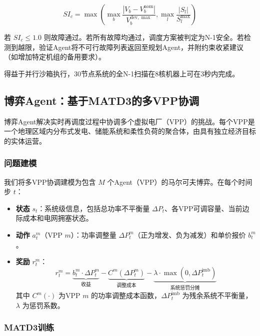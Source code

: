 \documentclass[conference]{IEEEtran}
\begin{document}
\begin{equation}
SI_c = \max\left( \max_{b} \frac{|V_b - V_b^{\text{nom}}|}{V_b^{\text{dev},\max}}, \max_{l} \frac{|S_l|}{S_l^{\max}} \right)
\end{equation}

若 $SI_c \leq 1.0$ 则故障通过。若所有故障均通过，调度方案被判定为N-1安全。若检测到越限，验证Agent将不可行故障列表返回至规划Agent，并附约束收紧建议（如增加特定机组的备用要求）。

得益于并行沙箱执行，30节点系统的全N-1扫描在8核机器上可在3秒内完成。

\subsection{博弈Agent：基于MATD3的多VPP协调}

博弈Agent解决实时再调度过程中协调多个虚拟电厂（VPP）的挑战。每个VPP是一个地理区域内分布式发电、储能系统和柔性负荷的聚合体，由具有独立经济目标的实体运营。

\subsubsection{问题建模}

我们将多VPP协调建模为包含 $M$ 个Agent（VPP）的马尔可夫博弈。在每个时间步 $t$：

\begin{itemize}
    \item \textbf{状态} $s_t$：系统级信息，包括总功率不平衡量 $\Delta P_t$、各VPP可调容量、当前边际成本和电网拥塞状态。
    \item \textbf{动作} $a_t^m$（VPP $m$）：功率调整量 $\Delta P_t^m$（正为增发、负为减发）和单价报价 $b_t^m$。
    \item \textbf{奖励} $r_t^m$：
    \begin{equation}
    r_t^m = \underbrace{b_t^m \cdot \Delta P_t^m}_{\text{收益}} - \underbrace{C^m(\Delta P_t^m)}_{\text{调整成本}} - \underbrace{\lambda \cdot \max(0, \Delta P_t^{\text{imb}})}_{\text{系统惩罚分摊}}
    \label{eq:vpp_reward}
    \end{equation}
    其中 $C^m(\cdot)$ 为VPP $m$ 的功率调整成本函数，$\Delta P_t^{\text{imb}}$ 为残余系统不平衡量，$\lambda$ 为惩罚系数。
\end{itemize}

\subsubsection{MATD3训练}
\end{document}
